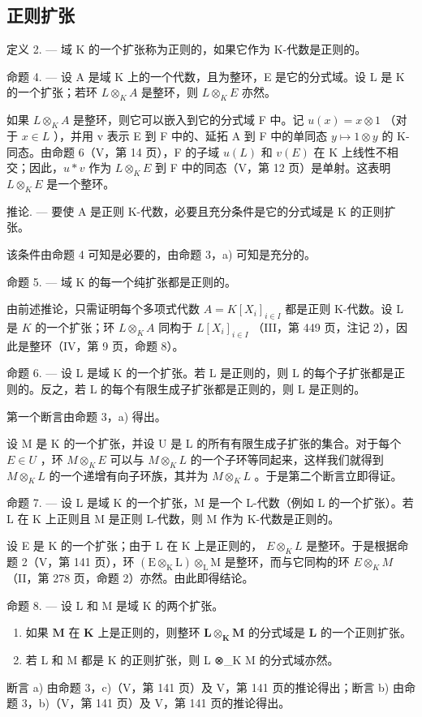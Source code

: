 \subsection{正则扩张}

定义 2. --- 域 K 的一个扩张称为正则的，如果它作为 K-代数是正则的。

命题 4. --- 设 A 是域 K 上的一个代数，且为整环，E 是它的分式域。设 L 是 K 的一个扩张；若环 \(L \otimes_{K} A\) 是整环，则 \(L \otimes_{K} E\) 亦然。

如果 \(L \otimes_{K} A\) 是整环，则它可以嵌入到它的分式域 F 中。记 \(u(x) = x \otimes 1\) （对于 \(x \in L\) ），并用 v 表示 E 到 F 中的、延拓 A 到 F 中的单同态 \(y \mapsto 1 \otimes y\) 的 K-同态。由命题 6（V，第 14 页），F 的子域 \(u(L)\) 和 \(v(E)\) 在 K 上线性不相交；因此，\(u * v\) 作为 \(L \otimes_{K} E\) 到 F 中的同态（V，第 12 页）是单射。这表明 \(L \otimes_{K} E\) 是一个整环。

推论. --- 要使 A 是正则 K-代数，必要且充分条件是它的分式域是 K 的正则扩张。

该条件由命题 4 可知是必要的，由命题 3，a) 可知是充分的。

命题 5. --- 域 K 的每一个纯扩张都是正则的。

由前述推论，只需证明每个多项式代数 \(A = K[X_{i}]_{i \in I}\) 都是正则 K-代数。设 L 是 \(K\) 的一个扩张；环 \(L \otimes_{K} A\) 同构于 \(L[X_{i}]_{i \in I}\) （III，第 449 页，注记 2），因此是整环（IV，第 9 页，命题 8）。

命题 6. --- 设 L 是域 K 的一个扩张。若 L 是正则的，则 L 的每个子扩张都是正则的。反之，若 L 的每个有限生成子扩张都是正则的，则 L 是正则的。

第一个断言由命题 3，a) 得出。

设 M 是 K 的一个扩张，并设 U 是 L 的所有有限生成子扩张的集合。对于每个 \(E \in U\) ，环 \(M \otimes_{K} E\) 可以与 \(M \otimes_{K} L\) 的一个子环等同起来，这样我们就得到 \(M \otimes_{K} L\) 的一个递增有向子环族，其并为 \(M \otimes_{K} L\) 。于是第二个断言立即得证。

命题 7. --- 设 L 是域 K 的一个扩张，M 是一个 L-代数（例如 L 的一个扩张）。若 L 在 K 上正则且 M 是正则 L-代数，则 M 作为 K-代数是正则的。

设 E 是 K 的一个扩张；由于 L 在 K 上是正则的， \(E \otimes_{K} L\) 是整环。于是根据命题 2（V，第 141 页），环 \((\mathrm{E} \otimes_{\mathrm{K}} \mathrm{L}) \otimes_{\mathrm{L}} \mathrm{M}\) 是整环，而与它同构的环 \(E \otimes_{K} M\) （II，第 278 页，命题 2）亦然。由此即得结论。

命题 8. --- 设 L 和 M 是域 K 的两个扩张。

\begin{enumerate}
\def\labelenumi{\alph{enumi})}
\item
  如果 \(\mathbf{M}\) 在 \(\mathbf{K}\) 上是正则的，则整环 \(\mathbf{L} \otimes_{\mathbf{K}} \mathbf{M}\) 的分式域是 \(\mathbf{L}\) 的一个正则扩张。
\item
  若 L 和 M 都是 K 的正则扩张，则 L ⊗\_K M 的分式域亦然。
\end{enumerate}

断言 a) 由命题 3，c)（V，第 141 页）及 V，第 141 页的推论得出；断言 b) 由命题 3，b)（V，第 141 页）及 V，第 141 页的推论得出。

